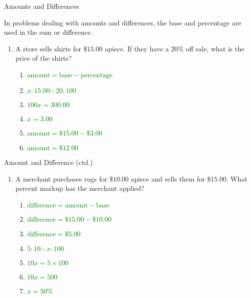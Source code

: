 \documentclass[]{beamer}
\begin{document}
\begin{frame}{Amounts and Differences}

    In problems dealing with amounts and differences, the base and percentage are used in the sum or difference.
    \begin{enumerate}[<+->]
        \item A store sells shirts for $\$15.00$ apiece. If they have
            a $20\%$ off sale, what is the price of the shirts?
            \begin{enumerate}
                \item \textcolor{green}{$\mathrm{amount} = \mathrm{base} - \mathrm{percentage} $}
                \item \textcolor{green}{$x : 15.00 :: 20 : 100 $}
                \item \textcolor{green}{$100x = 300.00 $}
                \item \textcolor{green}{$x = 3.00 $}
                \item \textcolor{green}{$\mathrm{amount} = \$15.00 - \$3.00$}
                \item \textcolor{green}{$\mathrm{amount} = \$12.00$}
            \end{enumerate}
    \end{enumerate}
\end{frame}

\begin{frame}{Amount and Difference (ctd.)}
    \begin{enumerate}[<+->][2]
        \item A merchant purchases rugs for $\$10.00$ apiece and sells
            them for $\$15.00$.  What percent markup has the merchant
            applied?
        \begin{enumerate}
            \item \textcolor{green}{$\mathrm{difference} = \mathrm{amount} - \mathrm{base} $}
            \item \textcolor{green}{$\mathrm{difference} = \$15.00 - \$10.00 $}
            \item \textcolor{green}{$\mathrm{difference} = \$5.00 $}
            \item \textcolor{green}{$ 5 : 10 :: x : 100 $}
            \item \textcolor{green}{$10x = 5 \times 100 $}
            \item \textcolor{green}{$10x = 500 $}
            \item \textcolor{green}{$x = 50\% $}
        \end{enumerate}
    \end{enumerate}
\end{frame}
\end{document}
